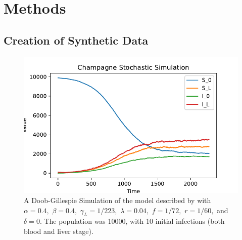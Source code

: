 \chapter{Methods}

\section{Creation of Synthetic Data}

\begin{figure}[htbp]
    \centering
    \includegraphics[width = \textwidth]{
        ../champagne_GP_images/champagne_simulation.pdf
    }
    \caption{
        A Doob-Gillespie Simulation of the model described by
        \cite{champagne_using_2022} with $\alpha = 0.4,$ $\beta = 0.4,$
        $\gamma_L = 1 / 223,$ $\lambda = 0.04,$ $f = 1 / 72,$ $r = 1 / 60,$ and
        $\delta = 0.$ The population was 10000, with 10 initial infections
        (both blood and liver stage).
    }
    \label{fig:champ_doob}
\end{figure}

